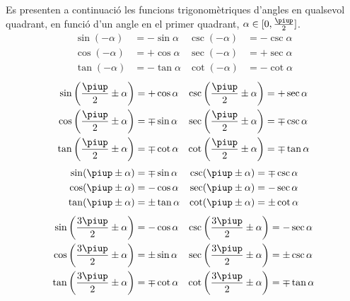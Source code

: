  Es presenten a continuaci\'{o}  les funcions trigonom\`{e}triques d'angles en qualsevol
quadrant, en funci\'{o} d'un angle en el primer quadrant,
$\alpha\in[0,\frac{\piup}{2}]$.
\begin{subequations}
\begin{align}
    \sin(-\alpha) &= -\sin\alpha  & \csc(-\alpha) &= -\csc\alpha \\
    \cos(-\alpha) &= +\cos\alpha  & \sec(-\alpha) &= +\sec\alpha \\
    \tan(-\alpha) &= -\tan\alpha  & \cot(-\alpha) &= -\cot\alpha
\end{align}
\end{subequations}
\vspace{-5mm}
\begin{subequations}
\begin{align}
    \sin\left(\frac{\piup}{2}\pm\alpha\right) &= +\cos\alpha    & \csc\left(\frac{\piup}{2}\pm\alpha\right) &= +\sec\alpha \\
    \cos\left(\frac{\piup}{2}\pm\alpha\right) &= \mp\sin\alpha  & \sec\left(\frac{\piup}{2}\pm\alpha\right) &= \mp\csc\alpha \\
    \tan\left(\frac{\piup}{2}\pm\alpha\right) &= \mp\cot\alpha  & \cot\left(\frac{\piup}{2}\pm\alpha\right) &= \mp\tan\alpha
\end{align}
\end{subequations}
\vspace{-5mm}
\begin{subequations}
\begin{align}
    \sin(\piup\pm\alpha) &= \mp\sin\alpha  & \csc(\piup\pm\alpha) &= \mp\csc\alpha \\
    \cos(\piup\pm\alpha) &= -\cos\alpha    & \sec(\piup\pm\alpha) &= -\sec\alpha \\
    \tan(\piup\pm\alpha) &= \pm\tan\alpha  & \cot(\piup\pm\alpha) &= \pm\cot\alpha
\end{align}
\end{subequations}
\vspace{-5mm}
\begin{subequations}
\begin{align}
    \sin\left(\frac{3\piup}{2}\pm\alpha\right) &= -\cos\alpha    & \csc\left(\frac{3\piup}{2}\pm\alpha\right) &= -\sec\alpha \\
    \cos\left(\frac{3\piup}{2}\pm\alpha\right) &= \pm\sin\alpha  & \sec\left(\frac{3\piup}{2}\pm\alpha\right) &= \pm\csc\alpha \\
    \tan\left(\frac{3\piup}{2}\pm\alpha\right) &= \mp\cot\alpha  & \cot\left(\frac{3\piup}{2}\pm\alpha\right) &= \mp\tan\alpha
\end{align}
\end{subequations}
